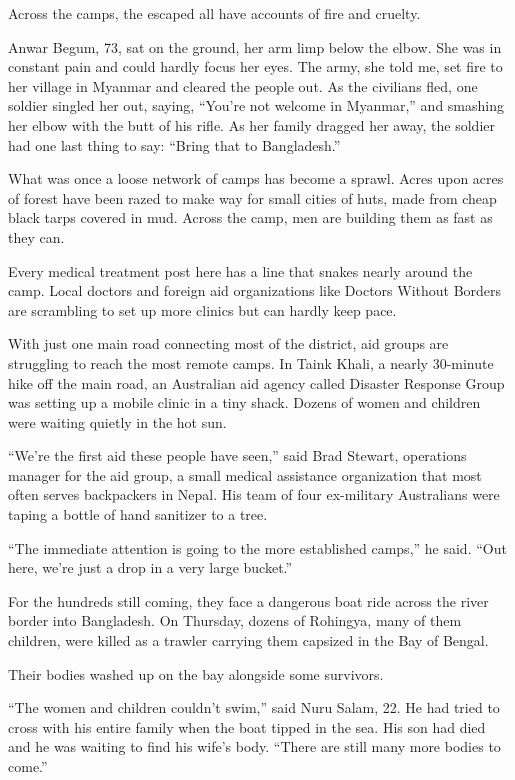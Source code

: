 Across the camps, the escaped all have accounts of fire and cruelty.

Anwar Begum, 73, sat on the ground, her arm limp below the elbow. She
was in constant pain and could hardly focus her eyes. The army, she told
me, set fire to her village in Myanmar and cleared the people out. As
the civilians fled, one soldier singled her out, saying, ``You're not
welcome in Myanmar,'' and smashing her elbow with the butt of his rifle.
As her family dragged her away, the soldier had one last thing to say:
``Bring that to Bangladesh.''

What was once a loose network of camps has become a sprawl. Acres upon
acres of forest have been razed to make way for small cities of huts,
made from cheap black tarps covered in mud. Across the camp, men are
building them as fast as they can.

Every medical treatment post here has a line that snakes nearly around
the camp. Local doctors and foreign aid organizations like Doctors
Without Borders are scrambling to set up more clinics but can hardly
keep pace.

With just one main road connecting most of the district, aid groups are
struggling to reach the most remote camps. In Taink Khali, a nearly
30-minute hike off the main road, an Australian aid agency called
Disaster Response Group was setting up a mobile clinic in a tiny shack.
Dozens of women and children were waiting quietly in the hot sun.

``We're the first aid these people have seen,'' said Brad Stewart,
operations manager for the aid group, a small medical assistance
organization that most often serves backpackers in Nepal. His team of
four ex-military Australians were taping a bottle of hand sanitizer to a
tree.

``The immediate attention is going to the more established camps,'' he
said. ``Out here, we're just a drop in a very large bucket.''

For the hundreds still coming, they face a dangerous boat ride across
the river border into Bangladesh. On Thursday, dozens of Rohingya, many
of them children, were killed as a trawler carrying them capsized in the
Bay of Bengal.

Their bodies washed up on the bay alongside some survivors.

``The women and children couldn't swim,'' said Nuru Salam, 22. He had
tried to cross with his entire family when the boat tipped in the sea.
His son had died and he was waiting to find his wife's body. ``There are
still many more bodies to come.''

